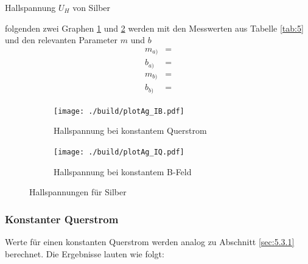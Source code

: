 \begin{table}[H]
    \centering
    
    \caption{Hallspannung $U_H$ von Silber}
    \label{tab:5}
\end{table}

\justifying folgenden zwei Graphen \ref{fig:4a} und \ref{fig:4b} werden mit den Messwerten aus Tabelle \ref{tab:5}
und den relevanten Parameter $m$ und $b$
\begin{subequations} \label{eq:28}
\begin{align}
    m_{a)} &= \text{} \label{eq:28a}\\
    b_{a)} &= \text{} \label{eq:28b}\\
    m_{b)} &= \text{} \label{eq:28c}\\
    b_{b)} &= \text{} \label{eq:28d}
\end{align}
\end{subequations}

\begin{figure}[H]
\begin{subfigure}{0.495\linewidth}
\centering
\texttt{[image: ./build/plotAg\_IB.pdf]}
\caption{Hallspannung bei konstantem Querstrom}
\label{fig:4a}
\end{subfigure}
\begin{subfigure}{0.495\linewidth}
\centering
\texttt{[image: ./build/plotAg\_IQ.pdf]}
\caption{Hallspannung bei konstantem B-Feld}
\label{fig:4b}
\end{subfigure}
\caption{Hallspannungen für Silber}
\label{fig:4}
\end{figure}

\subsubsection{Konstanter Querstrom} \label{sec:5.4.1}

\justifying Werte für einen konstanten Querstrom werden analog zu Abschnitt \ref{sec:5.3.1} berechnet. 
Die Ergebnisse lauten wie folgt:


